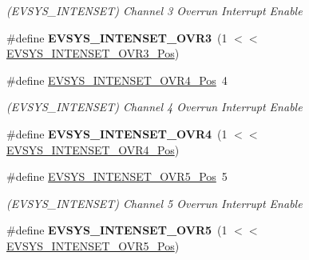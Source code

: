 \begin{DoxyCompactItemize}
\begin{DoxyCompactList}\small\item\em (E\+V\+S\+Y\+S\+\_\+\+I\+N\+T\+E\+N\+S\+E\+T) Channel 3 Overrun Interrupt Enable \end{DoxyCompactList}\item 
\hypertarget{group___s_a_m_l21___e_v_s_y_s_ga0dc207f3ff8cf67804325f6142ec57ee}{}\#define {\bfseries E\+V\+S\+Y\+S\+\_\+\+I\+N\+T\+E\+N\+S\+E\+T\+\_\+\+O\+V\+R3}~(1 $<$$<$ \hyperlink{group___s_a_m_l21___e_v_s_y_s_ga476cf4fce873b97960504c8cdfa80ae6}{E\+V\+S\+Y\+S\+\_\+\+I\+N\+T\+E\+N\+S\+E\+T\+\_\+\+O\+V\+R3\+\_\+\+Pos})\label{group___s_a_m_l21___e_v_s_y_s_ga0dc207f3ff8cf67804325f6142ec57ee}

\item 
\hypertarget{group___s_a_m_l21___e_v_s_y_s_ga7f7bf8a4770595a7d248a6126f468786}{}\#define \hyperlink{group___s_a_m_l21___e_v_s_y_s_ga7f7bf8a4770595a7d248a6126f468786}{E\+V\+S\+Y\+S\+\_\+\+I\+N\+T\+E\+N\+S\+E\+T\+\_\+\+O\+V\+R4\+\_\+\+Pos}~4\label{group___s_a_m_l21___e_v_s_y_s_ga7f7bf8a4770595a7d248a6126f468786}

\begin{DoxyCompactList}\small\item\em (E\+V\+S\+Y\+S\+\_\+\+I\+N\+T\+E\+N\+S\+E\+T) Channel 4 Overrun Interrupt Enable \end{DoxyCompactList}\item 
\hypertarget{group___s_a_m_l21___e_v_s_y_s_gaac1a30ed9aee37a09be4aef395a3a5d7}{}\#define {\bfseries E\+V\+S\+Y\+S\+\_\+\+I\+N\+T\+E\+N\+S\+E\+T\+\_\+\+O\+V\+R4}~(1 $<$$<$ \hyperlink{group___s_a_m_l21___e_v_s_y_s_ga7f7bf8a4770595a7d248a6126f468786}{E\+V\+S\+Y\+S\+\_\+\+I\+N\+T\+E\+N\+S\+E\+T\+\_\+\+O\+V\+R4\+\_\+\+Pos})\label{group___s_a_m_l21___e_v_s_y_s_gaac1a30ed9aee37a09be4aef395a3a5d7}

\item 
\hypertarget{group___s_a_m_l21___e_v_s_y_s_ga2a031d969e330e22997d1d3f047712a1}{}\#define \hyperlink{group___s_a_m_l21___e_v_s_y_s_ga2a031d969e330e22997d1d3f047712a1}{E\+V\+S\+Y\+S\+\_\+\+I\+N\+T\+E\+N\+S\+E\+T\+\_\+\+O\+V\+R5\+\_\+\+Pos}~5\label{group___s_a_m_l21___e_v_s_y_s_ga2a031d969e330e22997d1d3f047712a1}

\begin{DoxyCompactList}\small\item\em (E\+V\+S\+Y\+S\+\_\+\+I\+N\+T\+E\+N\+S\+E\+T) Channel 5 Overrun Interrupt Enable \end{DoxyCompactList}\item 
\hypertarget{group___s_a_m_l21___e_v_s_y_s_ga9607a4eed7d8af129689fb05ce9c4145}{}\#define {\bfseries E\+V\+S\+Y\+S\+\_\+\+I\+N\+T\+E\+N\+S\+E\+T\+\_\+\+O\+V\+R5}~(1 $<$$<$ \hyperlink{group___s_a_m_l21___e_v_s_y_s_ga2a031d969e330e22997d1d3f047712a1}{E\+V\+S\+Y\+S\+\_\+\+I\+N\+T\+E\+N\+S\+E\+T\+\_\+\+O\+V\+R5\+\_\+\+Pos})\label{group___s_a_m_l21___e_v_s_y_s_ga9607a4eed7d8af129689fb05ce9c4145}


\end{DoxyCompactItemize}
